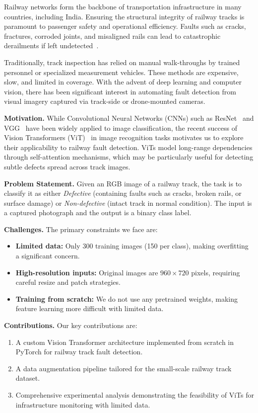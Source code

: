 \documentclass[10pt,twocolumn,letterpaper]{article}
\begin{document}
Railway networks form the backbone of transportation infrastructure in many countries, including India. Ensuring the structural integrity of railway tracks is paramount to passenger safety and operational efficiency. Faults such as cracks, fractures, corroded joints, and misaligned rails can lead to catastrophic derailments if left undetected~\cite{gibert2017deep}.

Traditionally, track inspection has relied on manual walk-throughs by trained personnel or specialized measurement vehicles. These methods are expensive, slow, and limited in coverage. With the advent of deep learning and computer vision, there has been significant interest in automating fault detection from visual imagery captured via track-side or drone-mounted cameras.

\textbf{Motivation.} While Convolutional Neural Networks (CNNs) such as ResNet~\cite{he2016deep} and VGG~\cite{simonyan2014very} have been widely applied to image classification, the recent success of Vision Transformers (ViT)~\cite{dosovitskiy2020image} in image recognition tasks motivates us to explore their applicability to railway fault detection. ViTs model long-range dependencies through self-attention mechanisms, which may be particularly useful for detecting subtle defects spread across track images.

\textbf{Problem Statement.} Given an RGB image of a railway track, the task is to classify it as either \textit{Defective} (containing faults such as cracks, broken rails, or surface damage) or \textit{Non-defective} (intact track in normal condition). The input is a captured photograph and the output is a binary class label.

\textbf{Challenges.} The primary constraints we face are:
\begin{itemize}
    \item \textbf{Limited data:} Only 300 training images (150 per class), making overfitting a significant concern.
    \item \textbf{High-resolution inputs:} Original images are $960 \times 720$ pixels, requiring careful resize and patch strategies.
    \item \textbf{Training from scratch:} We do not use any pretrained weights, making feature learning more difficult with limited data.
\end{itemize}

\textbf{Contributions.} Our key contributions are:
\begin{enumerate}
    \item A custom Vision Transformer architecture implemented from scratch in PyTorch for railway track fault detection.
    \item A data augmentation pipeline tailored for the small-scale railway track dataset.
    \item Comprehensive experimental analysis demonstrating the feasibility of ViTs for infrastructure monitoring with limited data.
\end{enumerate}
\end{document}
